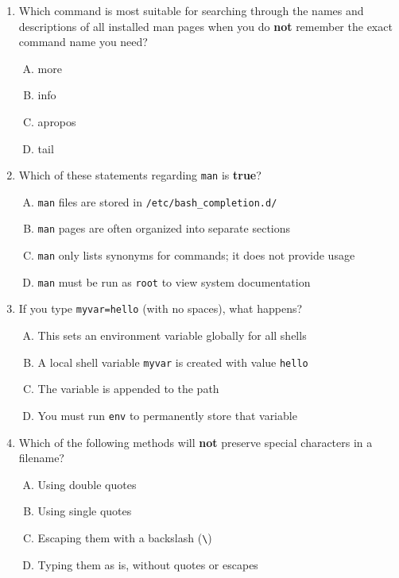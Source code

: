 \documentclass[a4paper]{report}
\begin{document}
\begin{enumerate}[1.]
    \item Which command is most suitable for searching through the names and descriptions of all installed man pages when you do \textbf{not} remember the exact command name you need?  
    \begin{enumerate}[A)]
        \item more  
        \item info  
        \item apropos  
        \item tail  
    \end{enumerate}

    \item Which of these statements regarding \texttt{man} is \textbf{true}?  
    \begin{enumerate}[A)]
        \item \texttt{man} files are stored in \texttt{/etc/bash\_completion.d/}  
        \item \texttt{man} pages are often organized into separate sections  
        \item \texttt{man} only lists synonyms for commands; it does not provide usage  
        \item \texttt{man} must be run as \texttt{root} to view system documentation  
    \end{enumerate}

    \item If you type \texttt{myvar=hello} (with no spaces), what happens?  
    \begin{enumerate}[A)]
        \item This sets an environment variable globally for all shells  
        \item A local shell variable \texttt{myvar} is created with value \texttt{hello}  
        \item The variable is appended to the path  
        \item You must run \texttt{env} to permanently store that variable  
    \end{enumerate}

    \item Which of the following methods will \textbf{not} preserve special characters in a filename?  
    \begin{enumerate}[A)]
        \item Using double quotes  
        \item Using single quotes  
        \item Escaping them with a backslash (\texttt{\textbackslash})  
        \item Typing them as is, without quotes or escapes  
    \end{enumerate}


\end{enumerate}
\end{document}
